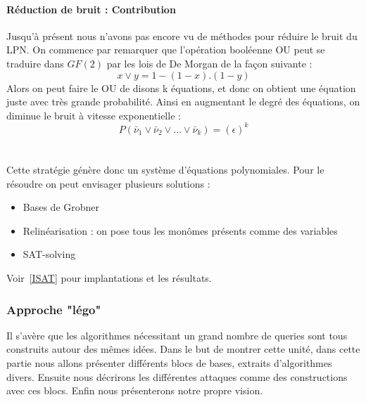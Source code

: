 \documentclass{article}		%
\theoremstyle{definition}
\theoremstyle{plain}
\theoremstyle{plain}
\theoremstyle{plain}
\theoremstyle{plain}
\theoremstyle{plain}
\begin{document}
\paragraph{Réduction de bruit : Contribution}  \label{SAT} 
Jusqu'à présent nous n'avons pas encore vu de méthodes pour réduire le
bruit du LPN. On commence par remarquer que l'opération booléenne OU peut
se traduire dans $GF(2)$ par les lois de De Morgan de la façon suivante : 
$$x\vee y=1-(1-x).(1-y)$$ 
Alors on peut faire le OU de disons k équations, et
donc on obtient une équation juste avec très grande probabilité.
Ainsi en augmentant le degré des équations, on diminue le bruit à
vitesse exponentielle :
 $$P(\bar\nu_1 \vee \bar\nu_2 \vee \dots \vee \bar\nu_k)=(\epsilon)^k$$
\\\\
Cette stratégie génère donc un système d'équations polynomiales. Pour le
résoudre on peut envisager plusieurs solutions :
\begin{itemize}
\item Bases de Grobner
\item Relinéarisation : on pose tous les monômes présents comme des
variables
\item SAT-solving
\end{itemize}
Voir~\ref{ISAT} pour implantations et les résultats.

\subsubsection{Approche "légo"}
Il s'avère que les algorithmes  nécessitant un grand nombre
de queries sont tous construits autour des mêmes idées. Dans le but de
montrer cette unité, dans cette partie nous allons présenter différents
blocs de bases, extraits d'algorithmes divers. Ensuite nous décrirons les
différentes attaques comme des constructions avec ces blocs. Enfin nous
présenterons notre propre vision.  
\end{document}
